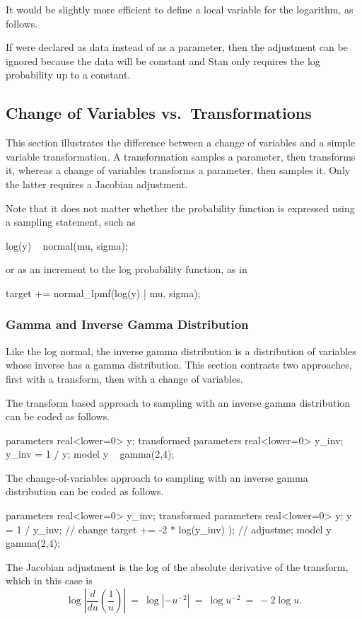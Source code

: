 It would be slightly more efficient to define a local variable for the
logarithm, as follows.
%
\begin{stancode}
model {
  real log_y;
  log_y = log(y);
  log_y ~ normal(mu, sigma);
  target += -log_y;
  ...
\end{stancode}
%

If  were declared as data instead of as a parameter, then the
adjustment can be ignored because the data will be constant and Stan
only requires the log probability up to a constant.

\subsection{Change of Variables vs.\ Transformations}

This section illustrates the difference between a change of variables
and a simple variable transformation.  A transformation samples a
parameter, then transforms it, whereas a change of variables
transforms a parameter, then samples it.  Only the latter requires a
Jacobian adjustment.  

Note that it does not matter whether the probability function is
expressed using a sampling statement, such as
%
\begin{stancode}
log(y) ~ normal(mu, sigma);
\end{stancode}
%
or as an increment to the log probability function, as in
%
\begin{stancode}
target += normal_lpmf(log(y) | mu, sigma);
\end{stancode}

\subsubsection{Gamma and Inverse Gamma Distribution}\label{jacobian-adjustment.section}

Like the log normal, the inverse gamma distribution is a distribution
of variables whose inverse has a gamma distribution.  This section
contrasts two approaches, first with a transform, then with a change
of variables. 

The transform based approach to sampling  with an inverse
gamma distribution can be coded as follows.
%
\begin{stancode}
parameters {
  real<lower=0> y;
}
transformed parameters {
  real<lower=0> y_inv;   
  y_inv = 1 / y;
}
model {
  y ~ gamma(2,4);
}
\end{stancode}
%
The change-of-variables approach to sampling  with an
inverse gamma distribution can be coded as follows.
%
\begin{stancode}
parameters {
  real<lower=0> y_inv;
}
transformed parameters {
  real<lower=0> y;
  y = 1 / y_inv;                         // change
  target +=  -2 * log(y_inv) );  // adjustme;
}
model {
  y ~ gamma(2,4);
}
\end{stancode}
%
The Jacobian adjustment is the log of the absolute derivative of the
transform, which in this case is
%
\[
\log \left| \frac{d}{du} \left( \frac{1}{u} \right) \right|
\ = \
\log | - u^{-2} |
\ = \
\log u^{-2}
\ = \
 -2 \log u.
\]


